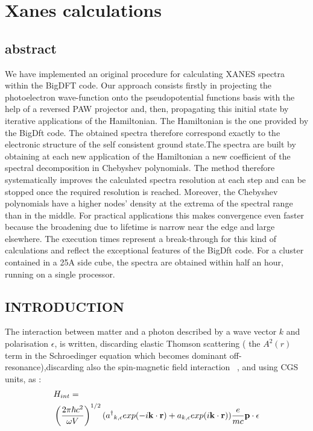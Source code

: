 \documentclass[a4paper,11pt]{report}
\begin{document}
\chapter{ Xanes calculations}

\section{abstract} 
We have implemented an original procedure for calculating XANES spectra within the BigDFT code. Our approach consists firstly in  projecting the photoelectron wave-function onto the pseudopotential functions basis with the help of a reversed PAW projector\cite{Taillefumier} and, then, propagating this initial state by iterative applications of the Hamiltonian. The Hamiltonian is the one provided by the BigDft code. The obtained spectra therefore correspond exactly to the electronic structure of the self consistent ground state.The spectra are built by obtaining at each new application of the Hamiltonian a new coefficient of the spectral decomposition in Chebyshev polynomials. The method therefore systematically improves the calculated spectra resolution at each step and can be stopped once the required resolution is reached. Moreover, the Chebyshev polynomials have a higher nodes' density at the extrema of the spectral range  than in the middle. For practical applications this makes convergence even faster because the broadening due to lifetime is narrow near the edge and large elsewhere. The execution times represent a break-through for this kind of calculations and reflect the exceptional features of the BigDft code. For a cluster contained in a 25A side cube, the spectra are obtained within half an hour, running on a single processor.


\section{INTRODUCTION}



The interaction between matter and  a photon described by a wave vector ${ k}$ and polarisation ${ \epsilon}$,
  is written, discarding elastic Thomson scattering ( the $ A^2(r)$ term in the Schroedinger equation which becomes dominant off-resonance),discarding also the spin-magnetic field interaction~\cite{blume} , and using CGS units,  as :
\begin{eqnarray}
&H_{int} =  \\
& \left( \frac{2 \pi \hbar c^2 }{ \omega V}\right)^{1/2}
({  a^\dagger }_{ k,\epsilon} exp(-i {{\bf k} \cdot {\bf r}} )+a_{k ,\epsilon} exp(i { {\bf k} \cdot {\bf  r}} ))\frac{e}{ m c} {  {\bf p} \cdot  {\bf \epsilon} } \label{fondamentale} \nonumber
\end{eqnarray}
\end{document}
